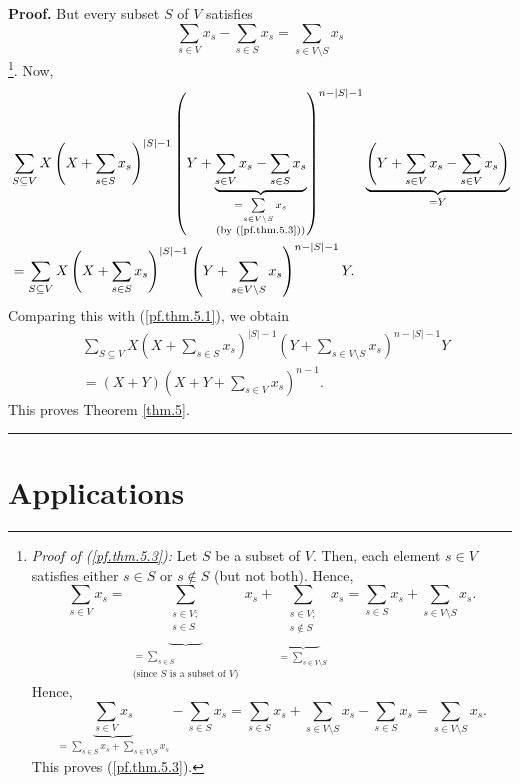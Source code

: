 \documentclass[numbers=enddot,12pt,final,onecolumn,notitlepage]{scrartcl}%
\theoremstyle{definition}
\newenvironment{proof}[1][Proof]{\noindent\textbf{#1.} }{\ \rule{0.5em}{0.5em}}
\let\sumnonlimits\sum
\renewcommand{\sum}{\sumnonlimits\limits}
\newenvironment{verlong}{}{}
\begin{document}
\begin{verlong}
\begin{proof}
But every subset $S$ of $V$ satisfies%
\begin{equation}
\sum_{s\in V}x_{s}-\sum_{s\in S}x_{s}=\sum_{s\in V\setminus S}x_{s}
\label{pf.thm.5.3}%
\end{equation}
\footnote{\textit{Proof of (\ref{pf.thm.5.3}):} Let $S$ be a subset of $V$.
Then, each element $s\in V$ satisfies either $s\in S$ or $s\notin S$ (but not
both). Hence,%
\[
\sum_{s\in V}x_{s}=\underbrace{\sum_{\substack{s\in V;\\s\in S}}}%
_{\substack{=\sum_{s\in S}\\\text{(since }S\text{ is a subset of }V\text{)}%
}}x_{s}+\underbrace{\sum_{\substack{s\in V;\\s\notin S}}}_{=\sum_{s\in
V\setminus S}}x_{s}=\sum_{s\in S}x_{s}+\sum_{s\in V\setminus S}x_{s}.
\]
Hence,%
\[
\underbrace{\sum_{s\in V}x_{s}}_{=\sum_{s\in S}x_{s}+\sum_{s\in V\setminus
S}x_{s}}-\sum_{s\in S}x_{s}=\sum_{s\in S}x_{s}+\sum_{s\in V\setminus S}%
x_{s}-\sum_{s\in S}x_{s}=\sum_{s\in V\setminus S}x_{s}.
\]
This proves (\ref{pf.thm.5.3}).}. Now,%
\begin{align*}
&  \sum_{S\subseteq V}X\left(  X+\sum_{s\in S}x_{s}\right)  ^{\left\vert
S\right\vert -1}\left(  Y+\underbrace{\sum_{s\in V}x_{s}-\sum_{s\in S}x_{s}%
}_{\substack{=\sum_{s\in V\setminus S}x_{s}\\\text{(by (\ref{pf.thm.5.3}))}%
}}\right)  ^{n-\left\vert S\right\vert -1}\underbrace{\left(  Y+\sum_{s\in
V}x_{s}-\sum_{s\in V}x_{s}\right)  }_{=Y}\\
&  =\sum_{S\subseteq V}X\left(  X+\sum_{s\in S}x_{s}\right)  ^{\left\vert
S\right\vert -1}\left(  Y+\sum_{s\in V\setminus S}x_{s}\right)  ^{n-\left\vert
S\right\vert -1}Y.
\end{align*}
Comparing this with (\ref{pf.thm.5.1}), we obtain%
\begin{align*}
&  \sum_{S\subseteq V}X\left(  X+\sum_{s\in S}x_{s}\right)  ^{\left\vert
S\right\vert -1}\left(  Y+\sum_{s\in V\setminus S}x_{s}\right)  ^{n-\left\vert
S\right\vert -1}Y\\
&  =\left(  X+Y\right)  \left(  X+Y+\sum_{s\in V}x_{s}\right)  ^{n-1}.
\end{align*}
This proves Theorem \ref{thm.5}.
\end{proof}
\end{verlong}

\section{Applications}
\end{document}
